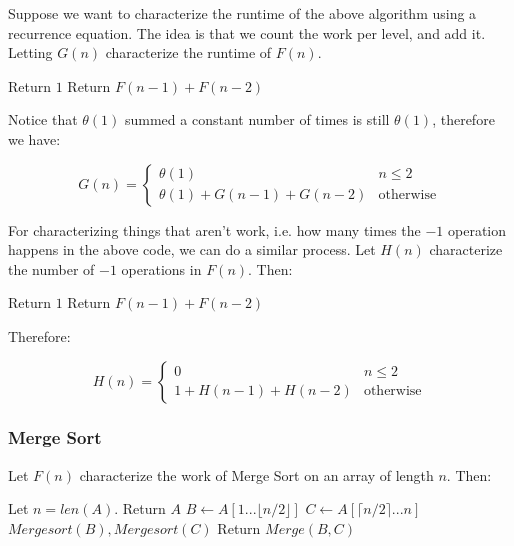 Suppose we want to characterize the runtime of the above algorithm using a
recurrence equation. The idea is that we count the work per level, and add it.
Letting $G(n)$ characterize the runtime of $F(n)$.

\begin{algorithmic}[1]
	 
		\State Return $1$ 
	\Else {}
		\State Return $F(n-1)+F(n-2)$ 
	\EndIf {}
\EndProcedure
\end{algorithmic}

Notice that $\theta(1)$ summed a constant number of times is still $\theta(1)$,
therefore we have:

$$
G(n) = \begin{cases}
\theta(1) & n \leq 2 \\
\theta(1) + G(n-1) + G(n-2) & \text{otherwise}
\end{cases}
$$

For characterizing things that aren't work, i.e. how many times the $-1$
operation happens in the above code, we can do a similar process. Let $H(n)$
characterize the number of $-1$ operations in $F(n)$. Then:

\begin{algorithmic}[1]
	 
		\State Return $1$ 
	\Else {}
		\State Return $F(n-1)+F(n-2)$ 
	\EndIf {}
\EndProcedure
\end{algorithmic}

Therefore:

$$
H(n) = \begin{cases}
0 & n \leq 2 \\
1 + H(n-1) + H(n-2) & \text{otherwise}
\end{cases}
$$

\subsubsection{Merge Sort}

Let $F(n)$ characterize the work of Merge Sort on an array of length $n$. Then:

\begin{algorithmic}[1]
	\State Let $n = len(A)$.
	 
		\State Return $A$ 
	\EndIf {}
	\State $B \gets A[1... \lfloor n/2 \rfloor]$ 
	\State $C \gets A[\lceil n/2 \rceil ... n]$ 
	\State $Mergesort(B), Mergesort(C)$ 
	\State Return $Merge(B,C)$  
\EndProcedure
\end{algorithmic}

